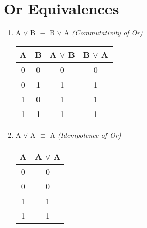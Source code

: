 \documentclass{report}
\begin{document}
\section{Or Equivalences}

\begin{enumerate}



  \item A $\lor$ B $\equiv$ B $\lor$ A \emph{(Commutativity of Or)}



\begin{center}

  \begin{tabular}{| c | c | c | c |}

    \hline

    A & B & A $\lor$ B & B $\lor$ A\\ \hline

    0 & 0 & 0 & 0 \\

    0 & 1 & 1 & 1 \\

    1 & 0 & 1 & 1 \\

    1 & 1 & 1 & 1 \\ \hline

  \end{tabular}

\end{center}



\item A $\lor$ A $\equiv$ A \emph{(Idempotence of Or)}



\begin{center}

  \begin{tabular}{| c | c |}

    \hline

    A & A $\lor$ A \\ \hline

    0 & 0 \\

    0 & 0 \\

    1 & 1 \\

    1 & 1 \\ \hline

  \end{tabular}


\end{center}
\end{enumerate}
\end{document}
